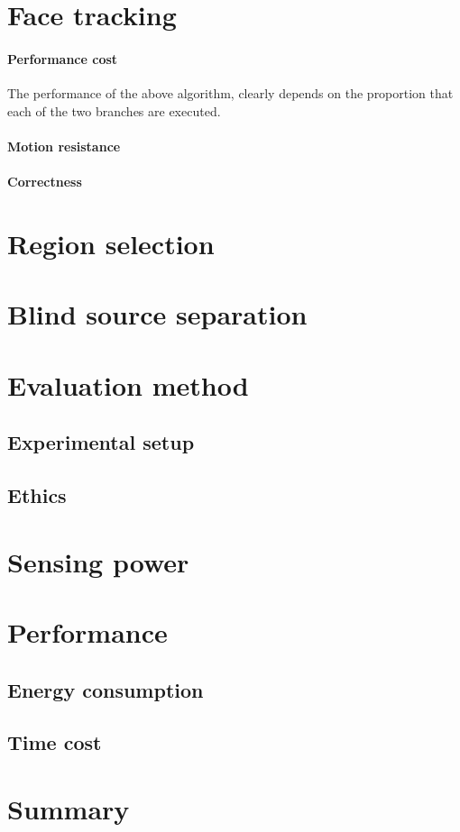 \section{Face tracking}
\label{section:face_tracking}
\paragraph{Performance cost}
The performance of the above algorithm, clearly depends on the proportion that each of the two branches are executed.
\paragraph{Motion resistance}

\paragraph{Correctness}

\section{Region selection}
\label{section:region_selection}

\section{Blind source separation}

\section{Evaluation method}
\subsection{Experimental setup}
\subsection{Ethics}

\section{Sensing power}
\section{Performance}
\subsection{Energy consumption}
\subsection{Time cost}
\section{Summary}